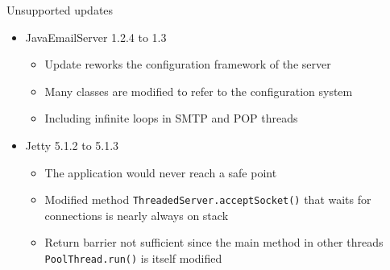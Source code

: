 \begin{frame}{Unsupported updates}%
\begin{itemize}
\item JavaEmailServer 1.2.4 to 1.3
  \begin{itemize}
  \item Update reworks the configuration framework of the server
  \item Many classes are modified to refer to the configuration system
  \item Including infinite loops in SMTP and POP threads
  \end{itemize}
\item Jetty 5.1.2 to 5.1.3
  \begin{itemize}
  \item The application would never reach a safe point
  \item Modified method {\tt ThreadedServer.acceptSocket()} that waits for
        connections is nearly always on stack
  \item Return barrier not sufficient since the main method in other
        threads {\tt PoolThread.run()} is itself modified
  \end{itemize}
\end{itemize}
\end{frame}
